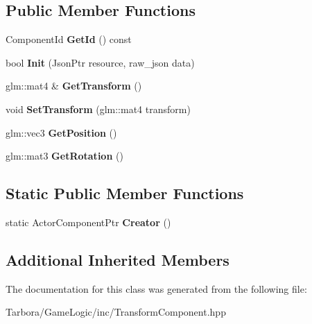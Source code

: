 \subsection*{Public Member Functions}
\begin{DoxyCompactItemize}
\item 
\mbox{\label{classTarbora_1_1TransformComponent_a61107459a83a52bc4ee42dc6b74e881d}} 
Component\+Id {\bfseries Get\+Id} () const
\item 
\mbox{\label{classTarbora_1_1TransformComponent_ab591e060b84d39e6cd5d97b37193c55f}} 
bool {\bfseries Init} (Json\+Ptr resource, raw\+\_\+json data)
\item 
\mbox{\label{classTarbora_1_1TransformComponent_abe8e8d96a33cd38b4d37be4c01ba59ba}} 
glm\+::mat4 \& {\bfseries Get\+Transform} ()
\item 
\mbox{\label{classTarbora_1_1TransformComponent_abb3f01a3863f7dfce1beccab3f4cf014}} 
void {\bfseries Set\+Transform} (glm\+::mat4 transform)
\item 
\mbox{\label{classTarbora_1_1TransformComponent_aae810fc641b72025475c609ad14deca0}} 
glm\+::vec3 {\bfseries Get\+Position} ()
\item 
\mbox{\label{classTarbora_1_1TransformComponent_ac5c3222f0c59c3182dbeaa9bacfd0f94}} 
glm\+::mat3 {\bfseries Get\+Rotation} ()
\end{DoxyCompactItemize}
\subsection*{Static Public Member Functions}
\begin{DoxyCompactItemize}
\item 
\mbox{\label{classTarbora_1_1TransformComponent_a4f04e5c3f18c53442cf8477e01c3df4a}} 
static Actor\+Component\+Ptr {\bfseries Creator} ()
\end{DoxyCompactItemize}
\subsection*{Additional Inherited Members}


The documentation for this class was generated from the following file\+:\begin{DoxyCompactItemize}
\item 
Tarbora/\+Game\+Logic/inc/Transform\+Component.\+hpp\end{DoxyCompactItemize}

